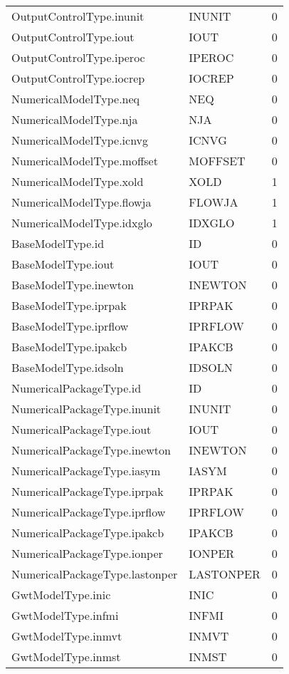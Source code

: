 \begin{longtable}{p{6cm} p{4cm} p{2cm} }
OutputControlType.inunit &  INUNIT & 0 \\ 
OutputControlType.iout &  IOUT & 0 \\ 
OutputControlType.iperoc &  IPEROC & 0 \\ 
OutputControlType.iocrep &  IOCREP & 0 \\ 
NumericalModelType.neq &  NEQ & 0 \\ 
NumericalModelType.nja &  NJA & 0 \\ 
NumericalModelType.icnvg &  ICNVG & 0 \\ 
NumericalModelType.moffset &  MOFFSET & 0 \\ 
NumericalModelType.xold &  XOLD & 1 \\ 
NumericalModelType.flowja &  FLOWJA & 1 \\ 
NumericalModelType.idxglo &  IDXGLO & 1 \\ 
BaseModelType.id &  ID & 0 \\ 
BaseModelType.iout &  IOUT & 0 \\ 
BaseModelType.inewton &  INEWTON & 0 \\ 
BaseModelType.iprpak &  IPRPAK & 0 \\ 
BaseModelType.iprflow &  IPRFLOW & 0 \\ 
BaseModelType.ipakcb &  IPAKCB & 0 \\ 
BaseModelType.idsoln &  IDSOLN & 0 \\ 
NumericalPackageType.id &  ID & 0 \\ 
NumericalPackageType.inunit &  INUNIT & 0 \\ 
NumericalPackageType.iout &  IOUT & 0 \\ 
NumericalPackageType.inewton &  INEWTON & 0 \\ 
NumericalPackageType.iasym &  IASYM & 0 \\ 
NumericalPackageType.iprpak &  IPRPAK & 0 \\ 
NumericalPackageType.iprflow &  IPRFLOW & 0 \\ 
NumericalPackageType.ipakcb &  IPAKCB & 0 \\ 
NumericalPackageType.ionper &  IONPER & 0 \\ 
NumericalPackageType.lastonper &  LASTONPER & 0 \\ 
GwtModelType.inic  &  INIC & 0 \\ 
GwtModelType.infmi &  INFMI & 0 \\ 
GwtModelType.inmvt &  INMVT & 0 \\ 
GwtModelType.inmst &  INMST & 0 \\ 

\end{longtable}
